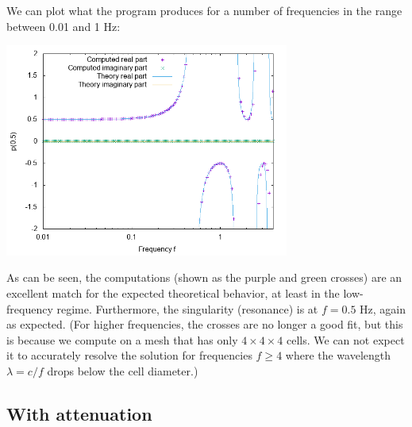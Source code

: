 \documentclass{article}
\begin{document}
We can plot what the program produces for a number of frequencies in
the range between 0.01 and 1 Hz:
%
%

\begin{center}
\includegraphics[width=0.7\textwidth]{no-attenuation/pressure-at-center.png}
\end{center}

As can be seen, the computations (shown as the purple and green crosses)
are an excellent match for the expected theoretical behavior, at least
in the low-frequency regime. Furthermore, the singularity (resonance)
is at $f=0.5$ Hz, again as expected. (For higher frequencies, the
crosses are no longer a good fit, but this is because we compute on a
mesh that has only $4\times 4\times 4$ cells. We can not expect it to
accurately resolve the solution for frequencies $f\ge 4$ where the
wavelength $\lambda=c/f$ drops below the cell diameter.)


\subsection{With attenuation}
\end{document}
